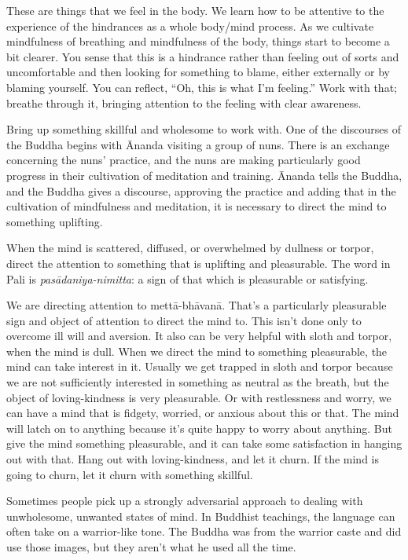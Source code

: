 These are things that we feel in the body. We learn how to be attentive
to the experience of the hindrances as a whole body/mind process. As we
cultivate mindfulness of breathing and mindfulness of the body, things
start to become a bit clearer. You sense that this is a hindrance rather
than feeling out of sorts and uncomfortable and then looking for
something to blame, either externally or by blaming yourself. You can
reflect, “Oh, this is what I’m feeling.” Work with that; breathe through
it, bringing attention to the feeling with clear awareness.

Bring up something skillful and wholesome to work with. One of the
discourses of the Buddha begins with Ānanda visiting a group of nuns.
There is an exchange concerning the nuns’ practice, and the nuns are
making particularly good progress in their cultivation of meditation and
training. Ānanda tells the Buddha, and the Buddha gives a discourse,
approving the practice and adding that in the cultivation of mindfulness
and meditation, it is necessary to direct the mind to something
uplifting.

When the mind is scattered, diffused, or overwhelmed by dullness or
torpor, direct the attention to something that is uplifting and
pleasurable. The word in Pali is \emph{pasādaniya-nimitta}: a sign of
that which is pleasurable or satisfying.

We are directing attention to mettā-bhāvanā. That’s a particularly
pleasurable sign and object of attention to direct the mind to. This
isn’t done only to overcome ill will and aversion. It also can be very
helpful with sloth and torpor, when the mind is dull. When we direct the
mind to something pleasurable, the mind can take interest in it. Usually
we get trapped in sloth and torpor because we are not sufficiently
interested in something as neutral as the breath, but the object of
loving-kindness is very pleasurable. Or with restlessness and worry, we
can have a mind that is fidgety, worried, or anxious about this or that.
The mind will latch on to anything because it’s quite happy to worry
about anything. But give the mind something pleasurable, and it can take
some satisfaction in hanging out with that. Hang out with
loving-kindness, and let it churn. If the mind is going to churn, let it
churn with something skillful.

Sometimes people pick up a strongly adversarial approach to dealing with
unwholesome, unwanted states of mind. In Buddhist teachings, the
language can often take on a warrior-like tone. The Buddha was from the
warrior caste and did use those images, but they aren’t what he used all
the time.

